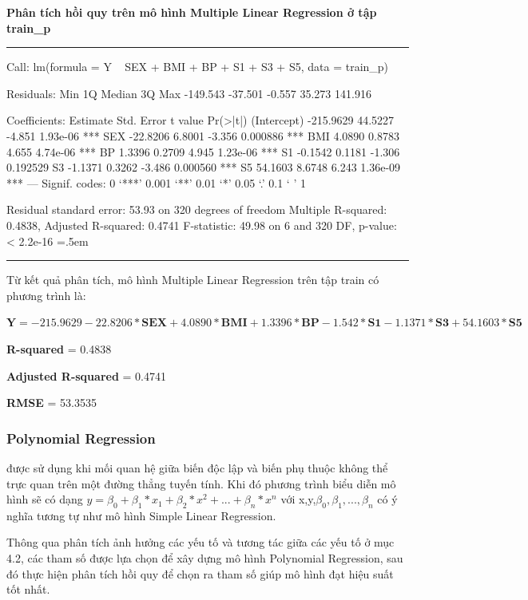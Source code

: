 \documentclass[runningheads]{llncs}
\newenvironment{lcverbatim}
 {\SaveVerbatim{cverb}}
 {\endSaveVerbatim
  \flushleft\fboxrule=0pt\fboxsep=.5em
  \colorbox{cverbbg}{%
    \makebox[\dimexpr\linewidth-2\fboxsep][l]{\BUseVerbatim{cverb}}%
  }
  \endflushleft
}
\begin{document}
\vspace{0.5cm}
\textbf{Phân tích hồi quy trên mô hình Multiple Linear Regression ở tập train\_p}
\vspace{0.5cm}
\hrule
\begin{lcverbatim}
Call:
lm(formula = Y ~ SEX + BMI + BP + S1 + S3 + S5, data = train_p)

Residuals:
     Min       1Q   Median       3Q      Max 
-149.543  -37.501   -0.557   35.273  141.916 

Coefficients:
             Estimate Std. Error t value Pr(>|t|)    
(Intercept) -215.9629    44.5227  -4.851 1.93e-06 ***
SEX          -22.8206     6.8001  -3.356 0.000886 ***
BMI            4.0890     0.8783   4.655 4.74e-06 ***
BP             1.3396     0.2709   4.945 1.23e-06 ***
S1            -0.1542     0.1181  -1.306 0.192529    
S3            -1.1371     0.3262  -3.486 0.000560 ***
S5            54.1603     8.6748   6.243 1.36e-09 ***
---
Signif. codes:  0 ‘***’ 0.001 ‘**’ 0.01 ‘*’ 0.05 ‘.’ 0.1 ‘ ’ 1

Residual standard error: 53.93 on 320 degrees of freedom
Multiple R-squared:  0.4838,	Adjusted R-squared:  0.4741 
F-statistic: 49.98 on 6 and 320 DF,  p-value: < 2.2e-16
\end{lcverbatim}
\hrule
\vspace{0.5cm}

Từ kết quả phân tích, mô hình Multiple Linear Regression trên tập train có phương trình là:
\begin{center}
	$\textbf{Y}=  -215.9629 -22.8206* \textbf{SEX} + 4.0890*\textbf{BMI} +  1.3396*\textbf{BP} -
	1.542*\textbf{S1} -1.1371*\textbf{S3} + 54.1603*\textbf{S5}$
\end{center}

\textbf{R-squared} = 0.4838

\textbf{Adjusted R-squared} = 0.4741

\textbf{RMSE} = 53.3535

\subsubsection{Polynomial Regression} được sử dụng khi mối quan hệ giữa biến độc lập và biến phụ thuộc không thể trực quan trên một đường thẳng tuyến tính. Khi đó phương trình biểu diễn mô hình sẽ có dạng $y= \beta_0 +\beta_1*x_1+\beta_2*x^2+...+\beta_n*x^n$ với x,y,$\beta_0, \beta_1,...,\beta_n$
có ý nghĩa tương tự như mô hình Simple Linear Regression.

Thông qua phân tích ảnh hưởng các yếu tố và tương tác giữa các yếu tố ở mục 4.2, các tham số được lựa chọn để xây dựng mô hình Polynomial Regression, sau đó thực hiện phân tích hồi quy để chọn ra tham số giúp mô hình đạt hiệu suất tốt nhất. 
\end{document}
